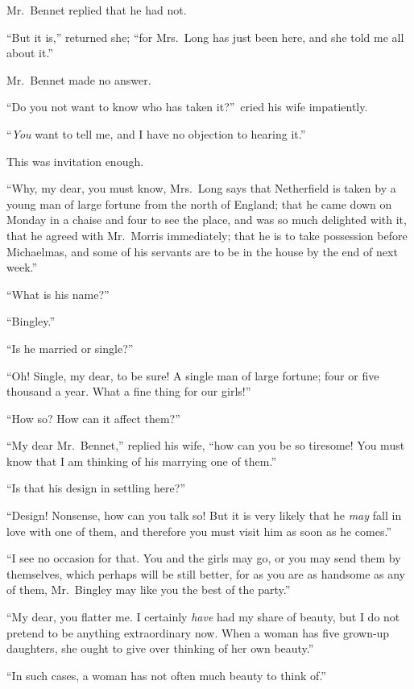\documentclass[12pt,english]{book}
\begin{document}
Mr.\ Bennet replied that he had not.

{}``But it is,'' returned she; {}``for Mrs.\ Long has just been
here, and she told me all about it.''

Mr.\ Bennet made no answer.

{}``Do you not want to know who has taken it?''\ cried his wife
impatiently.

{}``\textit{You} want to tell me, and I have no objection to hearing
it.''

This was invitation enough.

{}``Why, my dear, you must know, Mrs.\ Long says that Netherfield
is taken by a young man of large fortune from the north of England;
that he came down on Monday in a chaise and four to see the place,
and was so much delighted with it, that he agreed with Mr.\ Morris
immediately; that he is to take possession before Michaelmas, and
some of his servants are to be in the house by the end of next week.''

{}``What is his name?''\ 

{}``Bingley.''

{}``Is he married or single?''\ 

{}``Oh! Single, my dear, to be sure! A single man of large fortune;
four or five thousand a year. What a fine thing for our girls!''\ 

{}``How so? How can it affect them?''\ 

{}``My dear Mr.\ Bennet,'' replied his wife, {}``how can you be
so tiresome! You must know that I am thinking of his marrying one
of them.''

{}``Is that his design in settling here?''\ 

{}``Design! Nonsense, how can you talk so! But it is very likely
that he \textit{may} fall in love with one of them, and therefore
you must visit him as soon as he comes.''

{}``I see no occasion for that. You and the girls may go, or you
may send them by themselves, which perhaps will be still better, for
as you are as handsome as any of them, Mr.\ Bingley may like you
the best of the party.''

{}``My dear, you flatter me. I certainly \textit{have} had my share
of beauty, but I do not pretend to be anything extraordinary now.
When a woman has five grown-up daughters, she ought to give over thinking
of her own beauty.''

{}``In such cases, a woman has not often much beauty to think of.''
\end{document}
